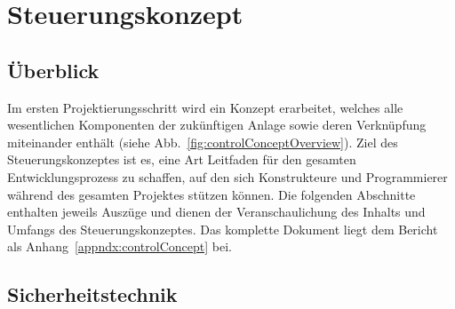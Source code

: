 

\section{Steuerungskonzept}
\label{sec:controlConcept}

\subsection{Überblick}

Im ersten Projektierungsschritt wird ein Konzept erarbeitet, welches alle wesentlichen Komponenten der zukünftigen Anlage sowie deren Verknüpfung miteinander enthält (siehe Abb.~\ref{fig:controlConceptOverview}). Ziel des Steuerungskonzeptes ist es, eine Art Leitfaden für den gesamten Entwicklungsprozess zu schaffen, auf den sich Konstrukteure und Programmierer während des gesamten Projektes stützen können.
Die folgenden Abschnitte enthalten jeweils Auszüge und dienen der Veranschaulichung des Inhalts und Umfangs des Steuerungskonzeptes. Das komplette Dokument liegt dem Bericht als Anhang~\ref{appndx:controlConcept} bei.


\subsection{Sicherheitstechnik}

